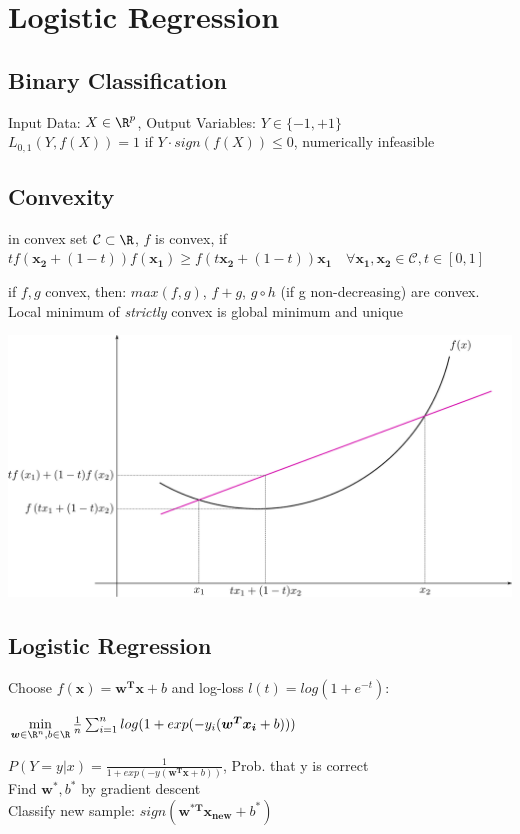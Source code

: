 \documentclass[english]{latex4ei/latex4ei_sheet}
\begin{document}
\section{Logistic Regression}
\begin{sectionbox}

\subsection{Binary Classification}
Input Data: $X \in \R^p$, Output Variables: $Y\in\{-1,+1\}$\\
$L_{0,1}(Y,f(X)) = 1$ \quad if $Y\cdot sign(f(X)) \leq 0$, numerically infeasible

\subsection{Convexity}
    \begin{emphbox}
    	in convex set $\mathcal{C} \subset \R$, $f$ is convex, if $tf(\boldsymbol{x_2}+(1-t))f(\boldsymbol{x_1}) \ge f(t\boldsymbol{x_2}+(1-t))\boldsymbol{x_1} \quad \forall \boldsymbol{x_1,x_2}\in \mathcal{C}, t\in[0,1]$
	\end{emphbox}
	if $f,g$ convex, then: $max(f,g)$, $f+g$, $g\circ h$ (if g non-decreasing) are convex. Local minimum of \emph{strictly} convex is global minimum and unique\\
	\begin{center}
	    \includegraphics[width = 0.7\columnwidth]{figures/convexity.png}
	\end{center}
\subsection{Logistic Regression}

Choose $f(\boldsymbol{x})=\boldsymbol{w^Tx}+b$ and log-loss $l(t)=log(1+e^{-t})$:
\begin{emphbox}
$\min\limits_{\boldsymbol{w}\in\R^n,b\in\R}\frac{1}{n}\sum_{i=1}^nlog(1+exp(-y_i(\boldsymbol{w^Tx_i}+b)))$
\end{emphbox}
$P(Y=y|x)=\frac{1}{1+exp(-y(\boldsymbol{w^Tx}+b))}$, Prob. that y is correct\\
Find $\boldsymbol{w^*}, b^*$ by gradient descent\\
Classify new sample: $sign(\boldsymbol{w^{*T}x_{new}}+b^*)$


\end{sectionbox}
\end{document}
